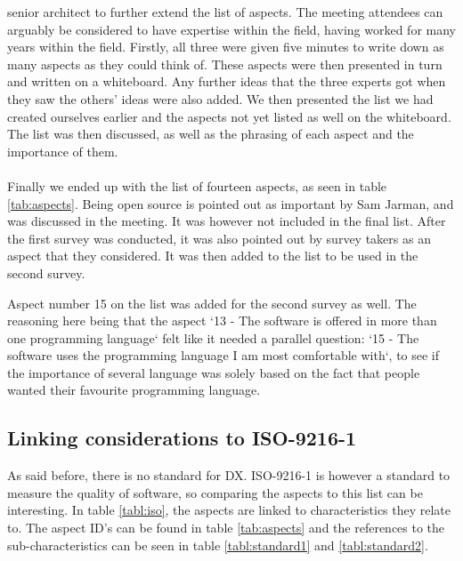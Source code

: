\documentclass{article}
\begin{document}
senior architect to further extend the list of aspects. The meeting attendees can arguably be considered
to have expertise within the field, having worked for many years within the field.
Firstly, all three
were given five minutes to write down as many aspects as they could think of.
These aspects were then presented in turn and written on a whiteboard. Any further ideas
that the three experts got when they saw the others' ideas were also added.
We then presented the list we had created ourselves earlier and the aspects not yet listed
as well on the whiteboard. The list was then discussed, as well as the phrasing of each aspect and the importance
of them.
\\ \\
Finally we ended up with the list of fourteen aspects, as seen in table \ref{tab:aspects}.
Being open source is pointed out as important by Sam Jarman, and was discussed in the meeting.
It was however not included in the final list. After the first survey was conducted, it was
also pointed out by survey takers as an aspect that they considered. It was then
added to the list to be used in the second survey.

Aspect number 15 on the list was
added for the second survey as well. The reasoning here being that the aspect
`13 - The software is offered in more than one programming language` felt
like it needed a parallel question: `15 - The software uses the programming language I am most comfortable with`,
to see if the importance of several language was solely based on the fact that
people wanted their favourite programming language.


\subsection{Linking considerations to ISO-9216-1}

As said before, there is no standard for DX. ISO-9216-1 is however a standard
to measure the quality of software, so comparing the aspects to this list can
be interesting. In table \ref{tabl:iso}, the aspects are linked to characteristics they relate to. The aspect ID's can
be found in table \ref{tab:aspects} and the references to the sub-characteristics can be seen in table \ref{tabl:standard1} and \ref{tabl:standard2}.
\end{document}
